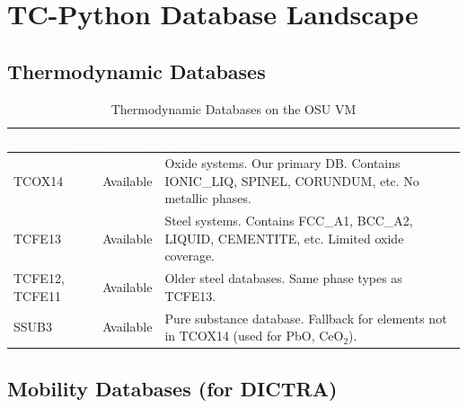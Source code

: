 \documentclass[11pt]{article}
\begin{document}
\section{TC-Python Database Landscape}
\label{sec:databases}

\subsection{Thermodynamic Databases}

\begin{table}[H]
\caption{Thermodynamic Databases on the OSU VM}
\label{tab:thermo_dbs}
\centering
\renewcommand{\arraystretch}{1.2}
\begin{tabular}{|l|l|p{3in}|}
\hline
\rowcolor{headercolor}
\textcolor{white}{\textbf{Database}} & \textcolor{white}{\textbf{Status}} & \textcolor{white}{\textbf{Notes}} \\
\hline
TCOX14 & Available & Oxide systems. Our primary DB. Contains IONIC\_LIQ, SPINEL, CORUNDUM, etc. No metallic phases. \\
\hline
\rowcolor{altrow}
TCFE13 & Available & Steel systems. Contains FCC\_A1, BCC\_A2, LIQUID, CEMENTITE, etc. Limited oxide coverage. \\
\hline
TCFE12, TCFE11 & Available & Older steel databases. Same phase types as TCFE13. \\
\hline
\rowcolor{altrow}
SSUB3 & Available & Pure substance database. Fallback for elements not in TCOX14 (used for PbO, CeO$_2$). \\
\hline
\end{tabular}
\end{table}

\subsection{Mobility Databases (for DICTRA)}
\end{document}
